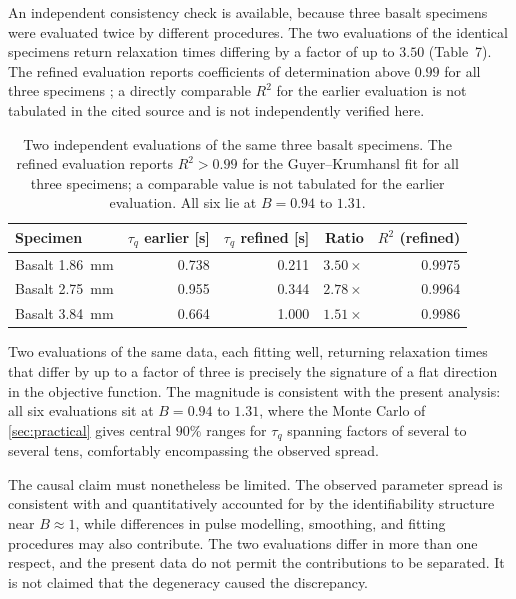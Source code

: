 \documentclass[preprint,12pt,a4paper]{elsarticle}
\theoremstyle{plain}
\theoremstyle{definition}
\theoremstyle{remark}
\newcommand{\tq}{\tau_{q}}
\newcommand{\Bnum}{B}
\begin{document}
An independent consistency check is available, because three basalt specimens
were evaluated twice by different procedures. The two evaluations of the
identical specimens return relaxation times differing by a factor of up to
$3.50$ (Table~7). The refined evaluation reports
coefficients of determination above $0.99$ for all three specimens
\cite{FeherKovacs2021}; a directly comparable $R^{2}$ for the earlier
evaluation is not tabulated in the cited source and is not independently
verified here.
\begin{table}[htbp]
  \centering
  \caption{Two independent evaluations of the same three basalt specimens.
           The refined evaluation reports $R^{2}>0.99$ for the
           Guyer--Krumhansl fit for all three specimens; a comparable value is
           not tabulated for the earlier evaluation. All six lie at
           $\Bnum=0.94$ to $1.31$.}
  \label{tab:discrepancy}
  \small
  \begin{tabular}{@{}lrrrr@{}}
    \toprule
    \textbf{Specimen} & $\tq$ earlier [\si{\second}] &
    $\tq$ refined [\si{\second}] & \textbf{Ratio} &
    $R^{2}$ (refined) \\
    \midrule
    Basalt \SI{1.86}{\milli\metre} & 0.738 & 0.211 & $3.50\times$ & 0.9975 \\
    Basalt \SI{2.75}{\milli\metre} & 0.955 & 0.344 & $2.78\times$ & 0.9964 \\
    Basalt \SI{3.84}{\milli\metre} & 0.664 & 1.000 & $1.51\times$ & 0.9986 \\
    \bottomrule
  \end{tabular}
\end{table}


Two evaluations of the same data, each fitting well, returning relaxation times
that differ by up to a factor of three is precisely the signature of a flat
direction in the objective function. The magnitude is consistent with the
present analysis: all six evaluations sit at $\Bnum = 0.94$ to $1.31$, where
the Monte Carlo of \cref{sec:practical} gives central $90\%$ ranges for $\tq$
spanning factors of several to several tens, comfortably encompassing the
observed spread.

The causal claim must nonetheless be limited. The observed parameter spread is
consistent with and quantitatively accounted for by the identifiability
structure near $\Bnum \approx 1$, while differences in pulse modelling,
smoothing, and fitting procedures may also contribute. The two evaluations
differ in more than one respect, and the present data do not permit the
contributions to be separated. It is not claimed that the degeneracy caused the
discrepancy.
\end{document}
